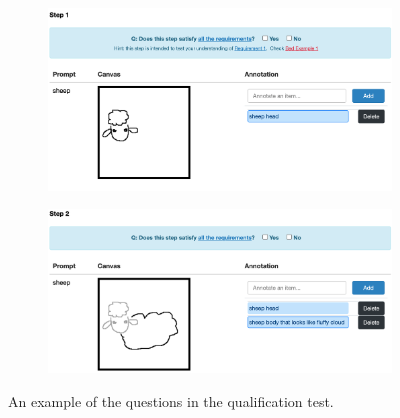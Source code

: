 \begin{figure}[]
\begin{subfigure}{\textwidth}
\centering
\includegraphics[width=.8\linewidth]{data_collection/v1_qual_q9_1.png}  
\end{subfigure}
\newline
\begin{subfigure}{\textwidth}
\centering
\includegraphics[width=.8\linewidth]{data_collection/v1_qual_q9_2.png}  
\end{subfigure}
\caption{An example of the questions in the qualification test.}
\label{v1.qualification.q9}
\end{figure}

